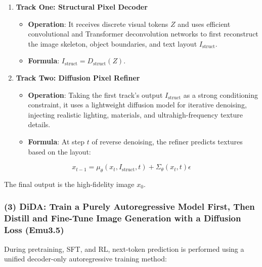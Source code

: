 \begin{enumerate}
\def\labelenumi{\arabic{enumi}.}
\item
  \textbf{Track One: Structural Pixel Decoder}

  \begin{itemize}
  \tightlist
  \item
    \textbf{Operation}: It receives discrete visual tokens \(Z\) and uses efficient convolutional and Transformer deconvolution networks to first reconstruct the image skeleton, object boundaries, and text layout \(I_{\mathrm{struct}}\).
  \item
    \textbf{Formula}: \(I_{\mathrm{struct}}=D_{\mathrm{struct}}(Z)\).
  \end{itemize}
\item
  \textbf{Track Two: Diffusion Pixel Refiner}

  \begin{itemize}
  \tightlist
  \item
    \textbf{Operation}: Taking the first track's output \(I_{\mathrm{struct}}\) as a strong conditioning constraint, it uses a lightweight diffusion model for iterative denoising, injecting realistic lighting, materials, and ultrahigh-frequency texture details.
  \item
{}
    \textbf{Formula}: At step \(t\) of reverse denoising, the refiner predicts textures based on the layout:
  \end{itemize}
\end{enumerate}

\[
x_{t-1}=\mu_{\theta}(x_t,I_{\mathrm{struct}},t)+\Sigma_{\theta}(x_t,t)\epsilon
\]

The final output is the high-fidelity image \(x_0\).

\hypertarget{dida-train-a-purely-autoregressive-model-first-then-distill-and-fine-tune-image-generation-with-a-diffusion-loss-emu3.5}{%
\subsubsection{(3) DiDA: Train a Purely Autoregressive Model First, Then Distill and Fine-Tune Image Generation with a Diffusion Loss (Emu3.5)}\label{dida-train-a-purely-autoregressive-model-first-then-distill-and-fine-tune-image-generation-with-a-diffusion-loss-emu3.5}}

During pretraining, SFT, and RL, next-token prediction is performed using a unified decoder-only autoregressive training method:

